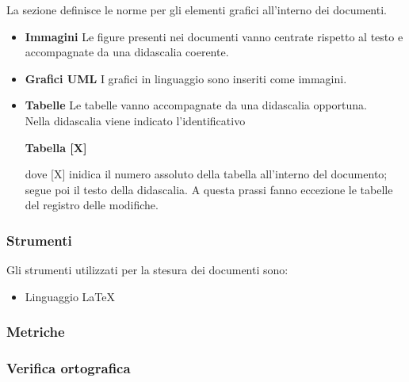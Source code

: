La sezione definisce le norme per gli elementi grafici all'interno dei documenti.
\begin{itemize}
\item\textbf{Immagini}
Le figure presenti nei documenti vanno centrate rispetto al testo e accompagnate da una didascalia coerente.
\item\textbf{Grafici UML}
I grafici in linguaggio  sono inseriti come immagini.
\item\textbf{Tabelle}
Le tabelle vanno accompagnate da una didascalia opportuna.\\
Nella didascalia viene indicato l'identificativo 
\begin{center}
	\textbf{Tabella [X]} 
\end{center}
dove [X] inidica il numero assoluto della tabella all'interno del documento; segue poi il testo della didascalia.
A questa prassi fanno eccezione le tabelle del registro delle modifiche.
\end{itemize}

\subsubsection{Strumenti} \label{Documentazione_Strumenti}
Gli strumenti utilizzati per la stesura dei documenti sono:
\begin{itemize}
	\item Linguaggio \LaTeX
\end{itemize}

\subsubsection{Metriche} 
\subsubsection{Verifica ortografica} 
